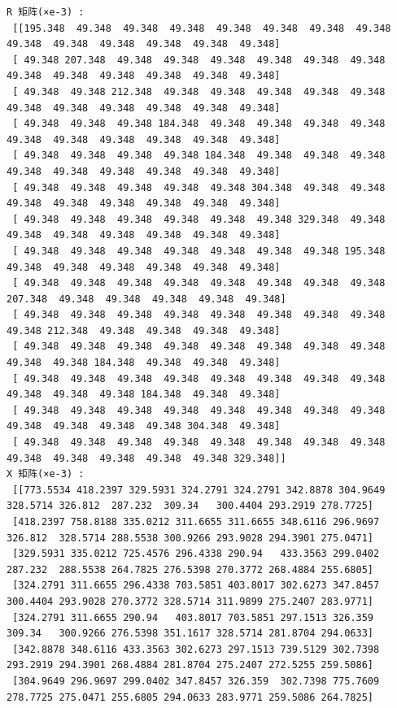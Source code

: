 \documentclass[11pt]{article}
\begin{document}
    \begin{Verbatim}[commandchars=\\\{\}]
R 矩阵(×e-3) : 
 [[195.348  49.348  49.348  49.348  49.348  49.348  49.348  49.348  49.348  49.348  49.348  49.348  49.348  49.348]
 [ 49.348 207.348  49.348  49.348  49.348  49.348  49.348  49.348  49.348  49.348  49.348  49.348  49.348  49.348]
 [ 49.348  49.348 212.348  49.348  49.348  49.348  49.348  49.348  49.348  49.348  49.348  49.348  49.348  49.348]
 [ 49.348  49.348  49.348 184.348  49.348  49.348  49.348  49.348  49.348  49.348  49.348  49.348  49.348  49.348]
 [ 49.348  49.348  49.348  49.348 184.348  49.348  49.348  49.348  49.348  49.348  49.348  49.348  49.348  49.348]
 [ 49.348  49.348  49.348  49.348  49.348 304.348  49.348  49.348  49.348  49.348  49.348  49.348  49.348  49.348]
 [ 49.348  49.348  49.348  49.348  49.348  49.348 329.348  49.348  49.348  49.348  49.348  49.348  49.348  49.348]
 [ 49.348  49.348  49.348  49.348  49.348  49.348  49.348 195.348  49.348  49.348  49.348  49.348  49.348  49.348]
 [ 49.348  49.348  49.348  49.348  49.348  49.348  49.348  49.348 207.348  49.348  49.348  49.348  49.348  49.348]
 [ 49.348  49.348  49.348  49.348  49.348  49.348  49.348  49.348  49.348 212.348  49.348  49.348  49.348  49.348]
 [ 49.348  49.348  49.348  49.348  49.348  49.348  49.348  49.348  49.348  49.348 184.348  49.348  49.348  49.348]
 [ 49.348  49.348  49.348  49.348  49.348  49.348  49.348  49.348  49.348  49.348  49.348 184.348  49.348  49.348]
 [ 49.348  49.348  49.348  49.348  49.348  49.348  49.348  49.348  49.348  49.348  49.348  49.348 304.348  49.348]
 [ 49.348  49.348  49.348  49.348  49.348  49.348  49.348  49.348  49.348  49.348  49.348  49.348  49.348 329.348]]
X 矩阵(×e-3) : 
 [[773.5534 418.2397 329.5931 324.2791 324.2791 342.8878 304.9649 328.5714 326.812  287.232  309.34   300.4404 293.2919 278.7725]
 [418.2397 758.8188 335.0212 311.6655 311.6655 348.6116 296.9697 326.812  328.5714 288.5538 300.9266 293.9028 294.3901 275.0471]
 [329.5931 335.0212 725.4576 296.4338 290.94   433.3563 299.0402 287.232  288.5538 264.7825 276.5398 270.3772 268.4884 255.6805]
 [324.2791 311.6655 296.4338 703.5851 403.8017 302.6273 347.8457 300.4404 293.9028 270.3772 328.5714 311.9899 275.2407 283.9771]
 [324.2791 311.6655 290.94   403.8017 703.5851 297.1513 326.359  309.34   300.9266 276.5398 351.1617 328.5714 281.8704 294.0633]
 [342.8878 348.6116 433.3563 302.6273 297.1513 739.5129 302.7398 293.2919 294.3901 268.4884 281.8704 275.2407 272.5255 259.5086]
 [304.9649 296.9697 299.0402 347.8457 326.359  302.7398 775.7609 278.7725 275.0471 255.6805 294.0633 283.9771 259.5086 264.7825]

\end{Verbatim}
\end{document}
